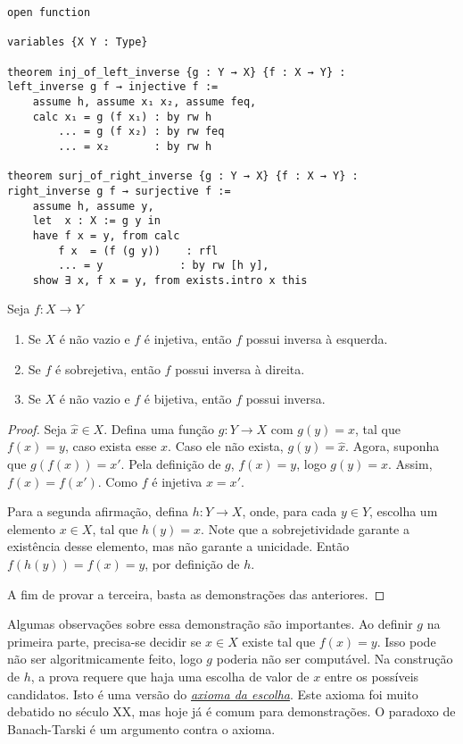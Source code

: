 \begin{lstlisting}
open function

variables {X Y : Type}

theorem inj_of_left_inverse {g : Y → X} {f : X → Y} :
left_inverse g f → injective f :=
    assume h, assume x₁ x₂, assume feq,
    calc x₁ = g (f x₁) : by rw h
        ... = g (f x₂) : by rw feq
        ... = x₂       : by rw h

theorem surj_of_right_inverse {g : Y → X} {f : X → Y} :
right_inverse g f → surjective f :=
    assume h, assume y,
    let  x : X := g y in
    have f x = y, from calc
        f x  = (f (g y))    : rfl
        ... = y            : by rw [h y],
    show ∃ x, f x = y, from exists.intro x this
\end{lstlisting}

\begin{theorem}
    \label{prop6}
    Seja $f: X \to Y$
    \renewcommand{\labelenumi}{\Roman{enumi}}
    \begin{enumerate}
        \item Se $X$ é não vazio e $f$ é injetiva, então $f$ possui inversa à esquerda.
        \item Se $f$ é sobrejetiva, então $f$ possui inversa à direita.
        \item Se $X$ é não vazio e $f$ é bijetiva, então $f$ possui inversa.
    \end{enumerate}
\end{theorem}

\begin{proof}
    Seja $\hat{x} \in X$. Defina uma função $g: Y \to X$ com $g(y) = x$, tal que $f(x) = y$,
    caso exista esse $x$. Caso ele não exista, $g(y) = \hat{x}$. Agora, suponha que
    $g(f(x)) = x'$. Pela definição de $g$, $f(x) = y$, logo $g(y) = x$. Assim, $f(x) = f(x')$.
    Como $f$ é injetiva $x = x'$.

    Para a segunda afirmação, defina $h: Y \to X$, onde, para cada $y \in Y$, escolha um elemento
    $x \in X$, tal que $h(y) = x$. Note que a sobrejetividade garante a existência desse elemento,
    mas não garante a unicidade. Então $f(h(y)) = f(x) = y$, por definição de $h$.

    A fim de provar a terceira, basta as demonstrações das anteriores.
\end{proof}

Algumas observações sobre essa demonstração são importantes. Ao definir $g$ na primeira parte,
precisa-se decidir se $x \in X$ existe tal que $f(x) = y$. Isso pode não ser algoritmicamente
feito, logo $g$ poderia não ser computável. Na construção de $h$, a prova requere que haja
uma escolha de valor de $x$ entre os possíveis candidatos. Isto é uma versão do
\href{https://pt.wikipedia.org/wiki/Axioma_da_escolha#Enunciado}{\textit{axioma da escolha}}.
Este axioma foi muito debatido no século XX, mas hoje já é comum para demonstrações. O paradoxo
de Banach-Tarski é um argumento contra o axioma.

